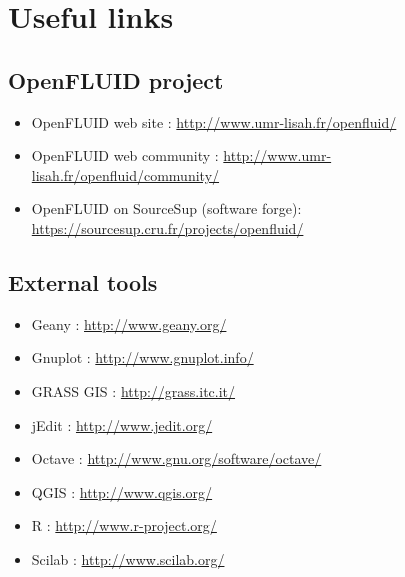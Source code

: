 \bigskip 

\section{Useful links}

\subsection{OpenFLUID project}

\begin{itemize}
  \item OpenFLUID web site : \textcolor{blue}{\url{http://www.umr-lisah.fr/openfluid/}}  
  \item OpenFLUID web community : \textcolor{blue}{\url{http://www.umr-lisah.fr/openfluid/community/}}
  \item OpenFLUID on SourceSup (software forge): \textcolor{blue}{\url{https://sourcesup.cru.fr/projects/openfluid/}} 
\end{itemize}


\subsection{External tools}

\begin{itemize}
  \item Geany : \textcolor{blue}{\url{http://www.geany.org/}}
  \item Gnuplot : \textcolor{blue}{\url{http://www.gnuplot.info/}}
  \item GRASS GIS : \textcolor{blue}{\url{http://grass.itc.it/}}
  \item jEdit : \textcolor{blue}{\url{http://www.jedit.org/}}
  \item Octave : \textcolor{blue}{\url{http://www.gnu.org/software/octave/}}
  \item QGIS : \textcolor{blue}{\url{http://www.qgis.org/}}
  \item R : \textcolor{blue}{\url{http://www.r-project.org/}}
  \item Scilab : \textcolor{blue}{\url{http://www.scilab.org/}} 
\end{itemize}   

